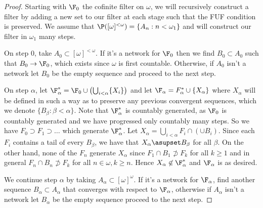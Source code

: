 \documentclass{article}
\begin{document}
\begin{proof}
    Starting with \(\F_0\) the cofinite filter on \(\omega\), we will recursively construct a filter by adding a new set to our filter at each stage such that the FUF condition is preserved. We assume that \(\P([\omega]^{<\omega}) = \{A_n : n < \omega_1\}\) and will construct our filter in \(\omega_1\) many steps.

    On step 0, take \(A_0 \subset [\omega]^{<\omega}\). If it's a network for \(\F_0\) then we find \(B_0 \subset A_0\) such that \(B_0 \to \F_0\), which exists since \(\omega\) is first countable. Otherwise, if \(A_0\) isn't a network let \(B_0\) be the empty sequence and proceed to the next step. 

    On step \(\alpha\), let \(\F_{\alpha}^{\ast} = \F_0\cup \left(\bigcup_{i < \alpha}\{X_i\}\right)\) and let \(\F_{\alpha} = F_{\alpha}^{\ast}\cup\{X_{\alpha}\}\) where \(X_{\alpha}\) will be defined in such a way as to preserve any previous convergent sequences, which we denote \(\{B_{\beta}:\beta < \alpha\}\). Note that \(\F_{\alpha}^{\ast}\) is countably generated, as \(\F_0\) is countably generated and we have progressed only countably many steps. So we have \(F_0 \supset F_1 \supset \dots\) which generate \(\F_{\alpha}^{\ast}\). Let \(X_{\alpha} = \bigcup_{i < \alpha}F_i\cap (\cup B_i)\). Since each \(F_i\) contains a tail of every \(B_{\beta}\), we have that \(X_{\alpha} \asupset B_{\beta}\) for all \(\beta\). On the other hand, none of the \(F_n\) generate \(X_{\alpha}\) since \(F_1 \cap B_1 \not\supset F_k\) for all \(k \geq 1\) and in general \(F_n \cap B_n \not \supset F_k\) for all \(n \in \omega, k \geq n\). Hence \(X_{\alpha}\not\in \F_{\alpha}^{\ast}\) and \(\F_{\alpha}\) is as desired.

    We continue step \(\alpha\) by taking \(A_{\alpha} \subset [\omega]^{\omega}\). If it's a network for \(\F_{\alpha}\), find another sequence \(B_\alpha \subset A_{\alpha}\) that converges with respect to \(\F_{\alpha}\), otherwise if \(A_{\alpha}\) isn't a network let \(B_{\alpha}\) be the empty sequence proceed to the next step.


\end{proof}
\end{document}
